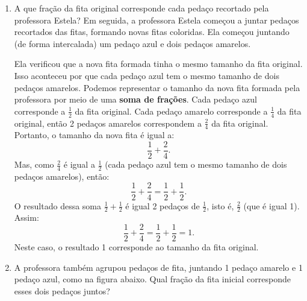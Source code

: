 \begin{enumerate} [\quad a)] %
  \item     A que fração da fita original corresponde cada pedaço recortado pela professora Estela?    \mbox{} \newline           \mbox{} \newline      Em seguida, a professora Estela começou a juntar pedaços recortados das fitas, formando novas fitas coloridas. Ela começou juntando (de forma intercalada) um pedaço azul e dois pedaços amarelos.     \mbox{} \newline      

\begin{center}
\end{center}

Ela verificou que a nova fita formada tinha o mesmo tamanho da fita original. Isso aconteceu por que cada pedaço azul tem o mesmo tamanho de dois pedaços amarelos. Podemos representar o tamanho da nova fita formada pela professora por meio de uma {\bf soma de frações}. Cada pedaço azul corresponde a $\frac{1}{2}$ da fita original. Cada pedaço amarelo corresponde a $\frac{1}{4}$ da fita original, então 2 pedaços amarelos correspondem a $\frac{2}{4}$ da fita original. Portanto, o tamanho da nova fita é igual a: $$\dfrac{1}{2} + \dfrac{2}{4}.$$ Mas, como $\frac{2}{4}$ é igual a $\frac{1}{2}$ (cada pedaço azul tem o mesmo tamanho de dois pedaços amarelos), então: $$\dfrac{1}{2} + \dfrac{2}{4} = \dfrac{1}{2} + \dfrac{1}{2}.$$ O resultado dessa soma $\frac{1}{2} + \frac{1}{2}$ é igual 2 pedaços de $\frac{1}{2}$, isto é, $\frac{2}{2}$ (que é igual 1). Assim: $$\dfrac{1}{2} + \dfrac{2}{4} = \dfrac{1}{2} + \dfrac{1}{2} = 1.$$ Neste caso, o resultado 1 corresponde ao tamanho da fita original.
  \item     A professora também agrupou pedaços de fita, juntando 1 pedaço amarelo e 1 pedaço azul, como na figura abaixo. Qual fração da fita inicial corresponde esses dois pedaços juntos?
\end{enumerate} %

